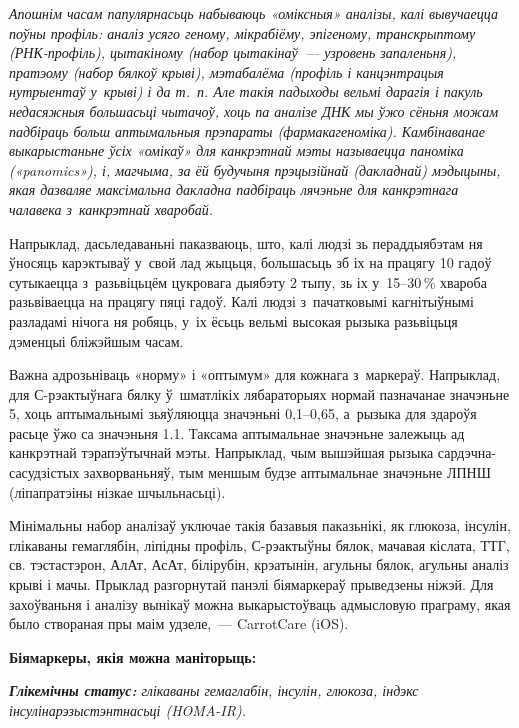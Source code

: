 \emph{Апошнім часам папулярнасьць набываюць «оміксныя» аналізы, калі вывучаецца поўны профіль: аналіз усяго геному, мікрабіёму, эпігеному, транскрыптому (РНК-профіль), цытакіному (набор цытакінаў~--- узровень запаленьня), пратэому (набор бялкоў крыві), мэтабалёма (профіль і канцэнтрацыя нутрыентаў у~крыві) і да т.~п. Але такія падыходы вельмі дарагія і пакуль недасяжныя большасьці чытачоў, хоць па аналізе ДНК мы ўжо сёньня можам падбіраць больш аптымальныя прэпараты (фармакагеноміка). Камбінаванае выкарыстаньне ўсіх «омікаў» для канкрэтнай мэты называецца паноміка («panomics»), і, магчыма, за ёй будучыня прэцызійнай (дакладнай) мэдыцыны, якая дазваляе максімальна дакладна падбіраць лячэньне для канкрэтнага чалавека з~канкрэтнай хваробай.}

Напрыклад, дасьледаваньні паказваюць, што, калі людзі зь пераддыябэтам ня ўносяць карэктываў у~свой лад жыцьця, большасьць зб іх на працягу 10 гадоў сутыкаецца з~разьвіцьцём цукровага дыябэту 2 тыпу, зь іх у~15--30\,\% хвароба разьвіваецца на працягу пяці гадоў. Калі людзі з~пачатковымі кагнітыўнымі разладамі нічога ня робяць, у~іх ёсьць вельмі высокая рызыка разьвіцьця дэменцыі бліжэйшым часам.

Важна адрозьніваць «норму» і «оптымум» для кожнага з~маркераў. Напрыклад, для С-рэактыўнага бялку ў~шматлікіх лябараторыях нормай пазначанае значэньне 5, хоць аптымальнымі зьяўляюцца значэньні 0,1--0,65, а~рызыка для здароўя расьце ўжо са значэньня 1.1. Таксама аптымальнае значэньне залежыць ад канкрэтнай тэрапэўтычнай мэты. Напрыклад, чым вышэйшая рызыка сардэчна-сасудзістых захворваньняў, тым меншым будзе аптымальнае значэньне ЛПНШ (ліпапратэіны нізкае шчыльнасьці).

Мінімальны набор аналізаў уключае такія базавыя паказьнікі, як глюкоза, інсулін, глікаваны гемаглябін, ліпідны профіль, С-рэактыўны бялок, мачавая кіслата, ТТГ, св. тэстастэрон, АлАт, АсАт, білірубін, крэатынін, агульны бялок, агульны аналіз крыві і мачы. Прыклад разгорнутай панэлі біямаркераў прыведзены ніжэй. Для захоўваньня і аналізу вынікаў можна выкарыстоўваць адмысловую праграму, якая было створаная пры маім удзеле,~--- CarrotCare (iOS).

\textbf{Біямаркеры, якія можна маніторыць:}


\emph{\textbf{Глікемічны статус:} глікаваны гемаглабін, інсулін, глюкоза, індэкс інсулінарэзыстэнтнасьці (HOMA-IR).}

